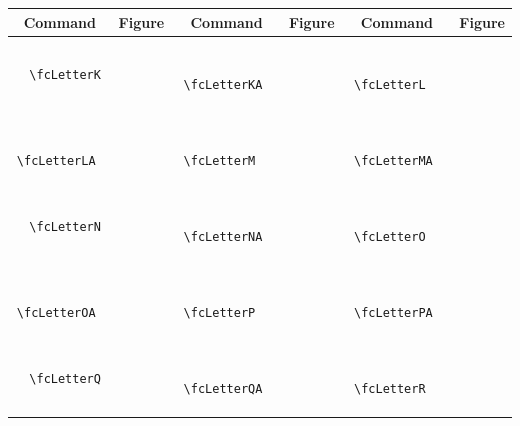 \documentclass[x11names]{article}
\begin{document}
\begin{table}[H]\centering\begin{tabular}{|c|c|c|c|c|c|}\hline{\bf Command} & {\bf Figure} & {\bf Command} & {\bf Figure} & {\bf Command} & {\bf Figure}\\	\hline	&\multirow{5}{*}{	\fcLetterK	[scale=0.16]} & &\multirow{5}{*}{	\fcLetterKA	[scale=0.16]} & &\multirow{5}{*}{	\fcLetterL	[scale=0.16]}\\	& & & & & \\	& & & & & \\	\verb|	\fcLetterK	| & & \verb|	\fcLetterKA	| & & \verb|	\fcLetterL	| & \\	& & & & & \\	& & & & & \\	& & & & & \\	\hline									
		&\multirow{5}{*}{	\fcLetterLA	[scale=0.16]} & &\multirow{5}{*}{	\fcLetterM	[scale=0.16]} & &\multirow{5}{*}{	\fcLetterMA	[scale=0.16]}\\	& & & & & \\	& & & & & \\	\verb|	\fcLetterLA	| & & \verb|	\fcLetterM	| & & \verb|	\fcLetterMA	| & \\	& & & & & \\	& & & & & \\	& & & & & \\	\hline									
		&\multirow{5}{*}{	\fcLetterN	[scale=0.16]} & &\multirow{5}{*}{	\fcLetterNA	[scale=0.16]} & &\multirow{5}{*}{	\fcLetterO	[scale=0.16]}\\	& & & & & \\	& & & & & \\	\verb|	\fcLetterN	| & & \verb|	\fcLetterNA	| & & \verb|	\fcLetterO	| & \\	& & & & & \\	& & & & & \\	& & & & & \\	\hline									
		&\multirow{5}{*}{	\fcLetterOA	[scale=0.16]} & &\multirow{5}{*}{	\fcLetterP	[scale=0.16]} & &\multirow{5}{*}{	\fcLetterPA	[scale=0.16]}\\	& & & & & \\	& & & & & \\	\verb|	\fcLetterOA	| & & \verb|	\fcLetterP	| & & \verb|	\fcLetterPA	| & \\	& & & & & \\	& & & & & \\	& & & & & \\	\hline									
		&\multirow{5}{*}{	\fcLetterQ	[scale=0.16]} & &\multirow{5}{*}{	\fcLetterQA	[scale=0.16]} & &\multirow{5}{*}{	\fcLetterR	[scale=0.16]}\\	& & & & & \\	& & & & & \\	\verb|	\fcLetterQ	| & & \verb|	\fcLetterQA	| & & \verb|	\fcLetterR	| & \\	& & & & & \\	& & & & & \\	& & & & & \\	\hline									

\end{tabular}
\end{table}
\end{document}
